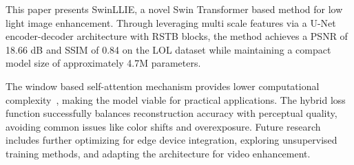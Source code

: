 \documentclass[conference]{IEEEtran}
\begin{document}
This paper presents SwinLLIE, a novel Swin Transformer based method for low light image enhancement. Through leveraging multi scale features via a U-Net encoder-decoder architecture with RSTB blocks, the method achieves a PSNR of 18.66 dB and SSIM of 0.84 on the LOL dataset while maintaining a compact model size of approximately 4.7M parameters. 

The window based self-attention mechanism provides lower computational complexity~\cite{liu2021swin}, making the model viable for practical applications. The hybrid loss function successfully balances reconstruction accuracy with perceptual quality, avoiding common issues like color shifts and overexposure. Future research includes further optimizing for edge device integration, exploring unsupervised training methods, and adapting the architecture for video enhancement.
\end{document}
